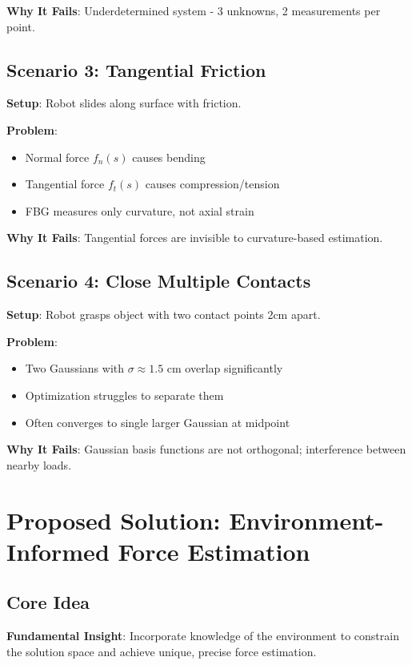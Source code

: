 \documentclass[11pt]{article}
\begin{document}
\textbf{Why It Fails}: Underdetermined system - 3 unknowns, 2 measurements per point.

\subsection{Scenario 3: Tangential Friction}

\textbf{Setup}: Robot slides along surface with friction.

\textbf{Problem}:
\begin{itemize}
    \item Normal force $f_n(s)$ causes bending
    \item Tangential force $f_t(s)$ causes compression/tension
    \item FBG measures only curvature, not axial strain
\end{itemize}

\textbf{Why It Fails}: Tangential forces are invisible to curvature-based estimation.

\subsection{Scenario 4: Close Multiple Contacts}

\textbf{Setup}: Robot grasps object with two contact points 2cm apart.

\textbf{Problem}:
\begin{itemize}
    \item Two Gaussians with $\sigma \approx 1.5$ cm overlap significantly
    \item Optimization struggles to separate them
    \item Often converges to single larger Gaussian at midpoint
\end{itemize}

\textbf{Why It Fails}: Gaussian basis functions are not orthogonal; interference between nearby loads.

\section{Proposed Solution: Environment-Informed Force Estimation}

\subsection{Core Idea}

\textbf{Fundamental Insight}: Incorporate knowledge of the environment to constrain the solution space and achieve unique, precise force estimation.
\end{document}
